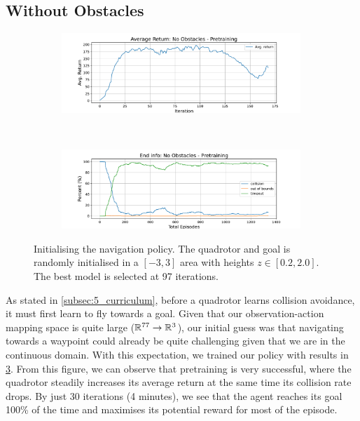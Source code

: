 \subsection{Without Obstacles}
\begin{figure}[H]
    \centering
    \begin{subfigure}[b]{\textwidth}
        \centering
        \captionsetup{justification=centering}
        \includegraphics[width=0.99\textwidth]{figures/7_/3DCarModel_BodyObs_0_NewObs_v0_reward.pdf}
        \label{fig:0_obst_pretraining_rew}
    \end{subfigure} \\
    \begin{subfigure}[b]{\textwidth}
        \centering
        \captionsetup{justification=centering}
        \includegraphics[width=0.99\textwidth]{figures/7_/3DCarModel_BodyObs_0_NewObs_v0_end_info.pdf}
        \label{fig:0_obst_pretraining_end}
    \end{subfigure} 
    \caption{Initialising the navigation policy. The quadrotor and goal is randomly initialised in a $[-3,3]$ area with heights $z \in [0.2, 2.0]$. The best model is selected at 97 iterations.}
    \label{fig:7_train_pretraining_no_obst}
\end{figure}
As stated in \cref{subsec:5_curriculum}, before a quadrotor learns collision avoidance, it must first learn to fly towards a goal. Given that our observation-action mapping space is quite large ($\mathbb{R}^{77} \rightarrow \mathbb{R}^{3}$), our initial guess was that navigating towards a waypoint could already be quite challenging given that we are in the continuous domain. 
With this expectation, we trained our policy with results in \cref{fig:7_train_pretraining_no_obst}.
From this figure, we can observe that pretraining is very successful, where the quadrotor steadily increases its average return at the same time its collision rate drops. By just 30 iterations (4 minutes), we see that the agent reaches its goal 100\% of the time and maximises its potential reward for most of the episode.

